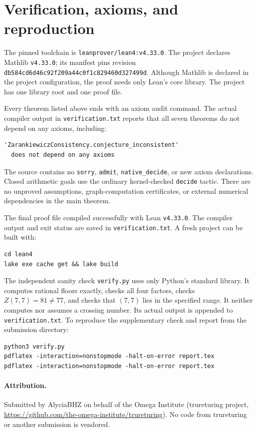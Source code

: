 \documentclass[11pt]{article}
\begin{document}
\section{Verification, axioms, and reproduction}
The pinned toolchain is \texttt{leanprover/lean4:v4.33.0}. The project
declares Mathlib \texttt{v4.33.0}; its manifest pins revision
\texttt{db584cd6d46c92f209a44c0f1c829460d327499d}. Although Mathlib is
declared in the project configuration, the proof needs only Lean's
core library. The project has one library root and one proof file.

Every theorem listed above ends with an axiom audit command. The actual
compiler output in \texttt{verification.txt} reports that all seven
theorems do not depend on any axioms, including:
\begin{verbatim}
'ZarankiewiczConsistency.conjecture_inconsistent'
  does not depend on any axioms
\end{verbatim}
The source contains no \texttt{sorry}, \texttt{admit},
\texttt{native\_decide}, or new axiom declarations. Closed arithmetic
goals use the ordinary kernel-checked \texttt{decide} tactic.
There are no unproved assumptions, graph-computation certificates, or
external numerical dependencies in the main theorem.

The final proof file compiled successfully with Lean \texttt{v4.33.0}.
The compiler output and exit status are saved in \texttt{verification.txt}.
A fresh project can be built with:
\begin{verbatim}
cd lean4
lake exe cache get && lake build
\end{verbatim}
The independent sanity check \texttt{verify.py} uses only Python's
standard library. It computes rational floors exactly, checks all four
factors, checks $Z(7,7)=81\ne77$, and checks that $(7,7)$ lies in the
specified range. It neither computes nor assumes a crossing number.
Its actual output is appended to \texttt{verification.txt}. To reproduce
the supplementary check and report from the submission directory:
\begin{verbatim}
python3 verify.py
pdflatex -interaction=nonstopmode -halt-on-error report.tex
pdflatex -interaction=nonstopmode -halt-on-error report.tex
\end{verbatim}

\paragraph{Attribution.}
Submitted by AlyciaBHZ on behalf of the Omega Institute (trureturing
project, \url{https://github.com/the-omega-institute/trureturing}).
No code from trureturing or another submission is vendored.
\end{document}

